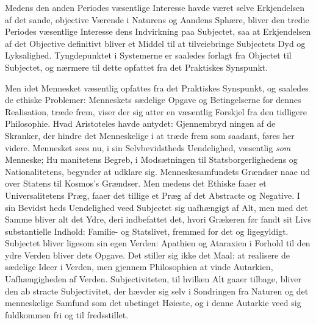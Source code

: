 \documentclass[12pt,a4paper]{book}
\begin{document}
Medens den anden Periodes væsentlige Interesse havde været
selve Erkjendelsen af det sande, objective Værende i Naturens
og Aandens Sphære, bliver den tredie Periodes væsentlige
Interesse dens Indvirkning paa Subjectet, saa at Erkjendelsen
af det Objective definitivt bliver et Middel til at tilveiebringe
Subjectets Dyd og Lyksalighed. Tyngdepunktet i Systemerne
er saaledes forlagt fra Objectet til Subjectet, og nærmere til
dette opfattet fra det Praktiskes Synspunkt.

Men idet Mennesket væsentlig opfattes fra det Praktiskes
Synspunkt, og saaledes de ethiske Problemer: Menneskets
sædelige Opgave og Betingelserne for dennes Realisation, træde
frem, viser der sig atter en væsentlig Forskjel fra den tidligere
Philosophie. Hvad Aristoteles havde antydet: Gjennembryd\-%
ningen af de Skranker, der hindre det Menneskelige i at træde
frem som saadant, føres her videre. Mennesket sees nu, i sin
Selvbevidstheds Uendelighed, væsentlig \emph{som} Menneske; Hu\-%
manitetens Begreb, i Modsætningen til Statsborgerlighedens og
Nationalitetens, begynder at udklare sig. Menneskesamfundets
Grændser naae ud over Statens til Kosmos's Grændser. Men
medens det Ethiske faaer et Universalitetens Præg, faaer det
tillige et Præg af det Abstracte og Negative. I sin Bevidst\-%
heds Uendelighed veed Subjectet sig uafhængigt af Alt, men
med det Samme bliver alt det Ydre, deri indbefattet det, hvori
Grækeren før fandt sit Livs substantielle Indhold: Familie- og
Statslivet, fremmed for det og ligegyldigt. Subjectet bliver
ligesom sin egen Verden: Apathien og Ataraxien i Forhold til
den ydre Verden bliver dets Opgave. Det stiller sig ikke det
Maal: at realisere de sædelige Ideer i Verden, men gjennem
Philosophien at vinde Autarkien, Uafhængigheden af Verden.
Subjectiviteten, til hvilken Alt gaaer tilbage, bliver den ab\-%
stracte Subjectivitet, der hævder sig selv i Sondringen fra
Naturen og det menneskelige Samfund som det ubetinget
Høieste, og i denne Autarkie veed sig fuldkommen fri og til\-%
fredsstillet.
\end{document}
